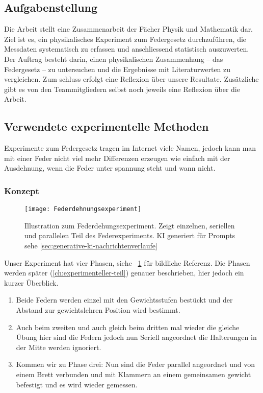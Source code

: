 \documentclass[../main.tex]{subfiles} %
\begin{document}
    \subsection{Aufgabenstellung}\label{subsec:aufgabenstellung}

        Die Arbeit stellt eine Zusammenarbeit der Fächer Physik und Mathematik dar.
        Ziel ist es, ein physikalisches Experiment zum Federgesetz durchzuführen, die Messdaten systematisch zu erfassen und anschliessend statistisch auszuwerten.
        Der Auftrag besteht darin, einen physikalischen Zusammenhang – das Federgesetz – zu untersuchen und die Ergebnisse mit Literaturwerten zu vergleichen.
        Zum schluss erfolgt eine Reflexion über unsere Resultate.
        Zusätzliche gibt es von den Teammitgliedern selbst noch jeweils eine Reflexion über die Arbeit.


    \subsection{Verwendete experimentelle Methoden}\label{subsec:verwendete-experimentelle-methoden}

        Experimente zum Federgesetz tragen im Internet viele Namen, jedoch kann man mit einer Feder nicht viel mehr Differenzen
        erzeugen wie einfach mit der Ausdehnung, wenn die Feder unter spannung steht und wann nicht.

        \subsubsection{Konzept}\label{subsubsec:konzept}

            \begin{figure}[h]
                \centering
                \texttt{[image: Federdehnungsexperiment]}
                \caption{Illustration zum Federdehungsexperiment. Zeigt einzelnen, seriellen und parallelen Teil des Federexperiments. KI generiert für Prompts sehe \ref{sec:generative-ki-nachrichtenverlaufe}}
                \label{fig:mesh1}
            \end{figure}

            Unser Experiment hat vier Phasen, siehe ~\ref{fig:mesh1} für bildliche Referenz.
            Die Phasen werden später (\ref{ch:experimenteller-teil}) genauer beschrieben, hier jedoch ein kurzer Überblick.
            \begin{enumerate}
                \item Beide Federn werden einzel mit den Gewichtsstufen bestückt und der Abstand zur gewichtslehren Position wird bestimmt.
                \item Auch beim zweiten und auch gleich beim dritten mal wieder die gleiche Übung hier sind die Federn jedoch nun Seriell angeordnet die Halterungen in der Mitte werden ignoriert.
                \item Kommen wir zu Phase drei: Nun sind die Feder parallel angeordnet und von einem Brett verbunden und mit Klammern an einem gemeinsamen gewicht befestigt und es wird wieder gemessen.
            \end{enumerate}
\end{document}
